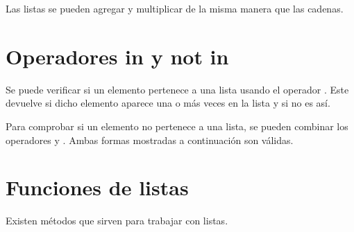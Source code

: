 Las listas se pueden agregar y multiplicar de la misma manera que las cadenas.


\section{Operadores in y not in}

Se puede verificar si un elemento pertenece a una lista usando el operador . Este devuelve  si dicho elemento aparece una o más veces en la lista y  si no es así.


Para comprobar si un elemento no pertenece a una lista, se pueden combinar los operadores  y . Ambas formas mostradas a continuación son válidas.


\section{Funciones de listas}

Existen métodos que sirven para trabajar con listas.

